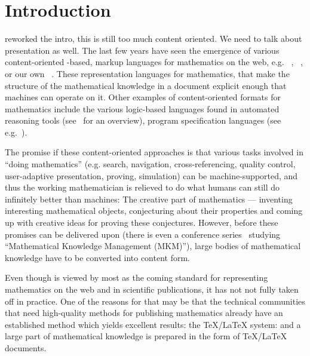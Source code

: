 \section{Introduction}\label{sec:intro}

\begin{newpart}{reworked the intro, this is still too much content oriented. We need to
    talk about presentation as well. }
The last few years have seen the emergence of various content-oriented {\xml}-based,
markup languages for mathematics on the web, e.g.  {\openmath}~\cite{BusCapCar:2oms04},
{\cmathml}~\cite{CarIon:MathML03}, or our own {\omdoc}~\cite{Kohlhase:omfmd05}. These
representation languages for mathematics, that make the structure of the mathematical
knowledge in a document explicit enough that machines can operate on it. Other examples of
content-oriented formats for mathematics include the various logic-based languages found
in automated reasoning tools (see~\cite{RobVor:hoar01} for an overview), program
specification languages (see e.g.~\cite{Bergstra:as89}).

The promise if these content-oriented approaches is that various tasks involved in ``doing
mathematics'' (e.g. search, navigation, cross-referencing, quality control, user-adaptive
presentation, proving, simulation) can be machine-supported, and thus the working
mathematician is relieved to do what humans can still do infinitely better than machines:
The creative part of mathematics --- inventing interesting mathematical objects,
conjecturing about their properties and coming up with creative ideas for proving these
conjectures. However, before these promises can be delivered upon (there is even a
conference series~\cite{MKM-IG-Meetings:web} studying ``Mathematical Knowledge Management
(MKM)''), large bodies of mathematical knowledge have to be converted into content form.

Even though {\mathml} is viewed by most as the coming standard for representing
mathematics on the web and in scientific publications, it has not not fully taken off in
practice. One of the reasons for that may be that the technical communities that need
high-quality methods for publishing mathematics already have an established method which
yields excellent results: the {\TeX/\LaTeX} system: and a large part of mathematical
knowledge is prepared in the form of {\TeX}/{\LaTeX} documents.


\end{newpart}
